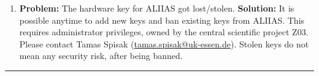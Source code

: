 \begin{enumerate}
     \item \label{faq:lostkey} \textbf{Problem:}
    The hardware key for ALIIAS got lost/stolen.
    \newline
    \textbf{Solution:}
    It is possible anytime to add new keys and ban existing keys from ALIIAS. This requires administrator privileges, owned by the central scientific project Z03. Please contact Tamas Spisak (\href{mailto:tamas.spisak@uk-essen.de}{\color{pniblue}tamas.spisak@uk-essen.de}). Stolen keys do not mean any security risk, after being banned.
    
\end{enumerate}

\par\noindent\rule{\textwidth\color{pniblue}}{0.4pt}
